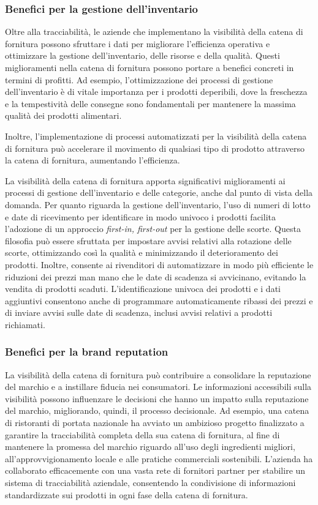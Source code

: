 \subsubsection{Benefici per la gestione dell'inventario}

Oltre alla tracciabilità, le aziende che implementano la visibilità della catena di fornitura possono sfruttare i dati per migliorare l'efficienza operativa e ottimizzare la gestione dell'inventario, delle risorse e della qualità. Questi miglioramenti nella catena di fornitura possono portare a benefici concreti in termini di profitti. Ad esempio, l'ottimizzazione dei processi di gestione dell'inventario è di vitale importanza per i prodotti deperibili, dove la freschezza e la tempestività delle consegne sono fondamentali per mantenere la massima qualità dei prodotti alimentari.

Inoltre, l'implementazione di processi automatizzati per la visibilità della catena di fornitura può accelerare il movimento di qualsiasi tipo di prodotto attraverso la catena di fornitura, aumentando l'efficienza.

La visibilità della catena di fornitura apporta significativi miglioramenti ai processi di gestione dell'inventario e delle categorie, anche dal punto di vista della domanda. Per quanto riguarda la gestione dell'inventario, l'uso di numeri di lotto e date di ricevimento per identificare in modo univoco i prodotti facilita l'adozione di un approccio \textit{first-in, first-out} per la gestione delle scorte. Questa filosofia può essere sfruttata per impostare avvisi relativi alla rotazione delle scorte, ottimizzando così la qualità e minimizzando il deterioramento dei prodotti. Inoltre, consente ai rivenditori di automatizzare in modo più efficiente le riduzioni dei prezzi man mano che le date di scadenza si avvicinano, evitando la vendita di prodotti scaduti. L'identificazione univoca dei prodotti e i dati aggiuntivi consentono anche di programmare automaticamente ribassi dei prezzi e di inviare avvisi sulle date di scadenza, inclusi avvisi relativi a prodotti richiamati.

\subsubsection{Benefici per la brand reputation}

La visibilità della catena di fornitura può contribuire a consolidare la reputazione del marchio e a instillare fiducia nei consumatori. Le informazioni accessibili sulla visibilità possono influenzare le decisioni che hanno un impatto sulla reputazione del marchio, migliorando, quindi, il processo decisionale. Ad esempio, una catena di ristoranti di portata nazionale ha avviato un ambizioso progetto finalizzato a garantire la tracciabilità completa della sua catena di fornitura, al fine di mantenere la promessa del marchio riguardo all'uso degli ingredienti migliori, all'approvvigionamento locale e alle pratiche commerciali sostenibili. L'azienda ha collaborato efficacemente con una vasta rete di fornitori partner per stabilire un sistema di tracciabilità aziendale, consentendo la condivisione di informazioni standardizzate sui prodotti in ogni fase della catena di fornitura.

